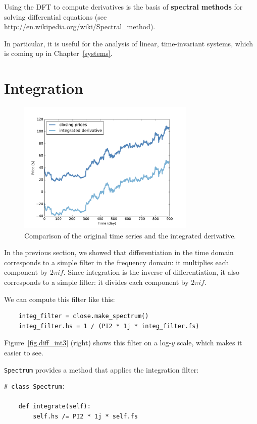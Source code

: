 \documentclass[12pt]{book}
\begin{document}
Using the DFT to compute derivatives is the basis of {\bf spectral
  methods} for solving differential equations (see
\url{http://en.wikipedia.org/wiki/Spectral_method}).

In particular, it is useful for the analysis of linear, time-invariant
systems, which is coming up in Chapter~\ref{systems}.


\section{Integration}

\begin{figure}
\centerline{\includegraphics[height=2.5in]{figs/diff_int5.pdf}}
\caption{Comparison of the original time series and the integrated
derivative.}
\label{fig.diff_int5}
\end{figure}

In the previous section, we showed that differentiation in the time
domain corresponds to a simple filter in the frequency domain: it
multiplies each component by $2 \pi i f$.  Since integration is
the inverse of differentiation, it also corresponds to a simple
filter: it divides each component by $2 \pi i f$.

We can compute this filter like this:

\begin{verbatim}
    integ_filter = close.make_spectrum()
    integ_filter.hs = 1 / (PI2 * 1j * integ_filter.fs)
\end{verbatim}

Figure~\ref{fig.diff_int3} (right) shows this filter on a log-$y$ scale,
which makes it easier to see.

{\tt Spectrum} provides a method that applies the integration filter:

\begin{verbatim}
# class Spectrum:

    def integrate(self):
        self.hs /= PI2 * 1j * self.fs
\end{verbatim}
\end{document}
